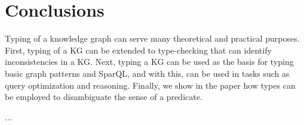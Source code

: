 \documentclass[runningheads]{llncs}
\begin{document}
\section{Conclusions}

Typing of a knowledge graph can serve many theoretical and practical
purposes. First, typing of a KG can be extended to type-checking that
can identify inconsistencies in a KG. Next, typing a KG can be used as
the basis for typing basic graph patterns and SparQL, and with this,
can be used in tasks such as query optimization and
reasoning. Finally, we show in the paper how types can be employed to
disambiguate the sense of a predicate.

... \\





%



\end{document}

